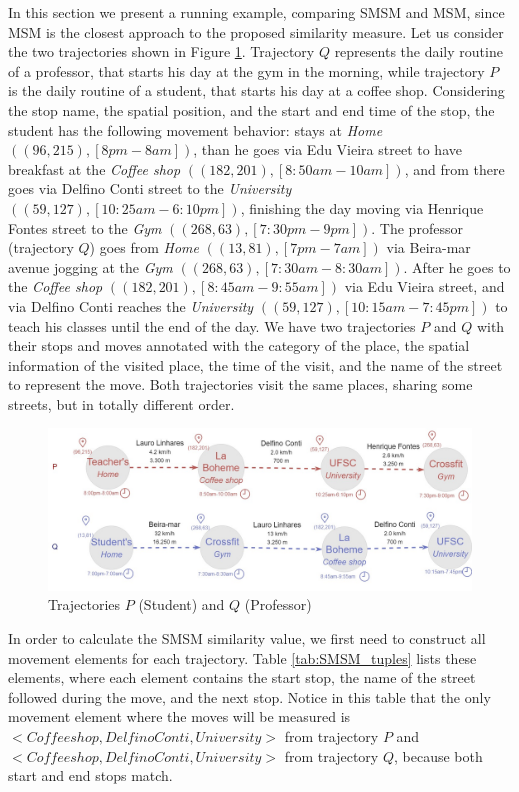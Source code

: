 \documentclass[12pt]{article}
\begin{document}
In this section we present a running example, comparing SMSM and MSM, since MSM is the closest approach to the proposed similarity measure.
Let us consider the two trajectories shown in Figure \ref{fig:SMSM_examples_PQ}. Trajectory $Q$ represents the daily routine of a professor, that starts his day at the gym in the morning, while trajectory $P$ is the daily routine of a student, that starts his day at a coffee shop. Considering the stop name, the spatial position, and the start and end time of the stop, the student has the following movement behavior: stays at \textit{Home} $((96,215), [8pm-8am])$, than he goes via Edu Vieira street to have breakfast at the \textit{Coffee shop} $((182,201), [8:50am-10am])$, and from there goes via Delfino Conti street to the \textit{University} $((59,127), [10:25am-6:10pm])$, finishing the day moving via Henrique Fontes street to the \textit{Gym} $((268,63), [7:30pm-9pm])$. The professor (trajectory $Q$) goes from \textit{Home} $((13,81), [7pm-7am])$ via Beira-mar avenue jogging at the \textit{Gym} $((268,63), [7:30am-8:30am])$. After he goes to the \textit{Coffee shop} $((182,201), [8:45am-9:55am])$ via Edu Vieira street, and via Delfino Conti reaches the \textit{University} $((59,127), [10:15am-7:45pm])$ to teach his classes until the end of the day. We have two trajectories $P$ and $Q$ with their stops and moves annotated with the category of the place, the spatial information of the visited place, the time of the visit, and the name of the street to represent the move. Both trajectories visit the same places, sharing some streets, but in totally different order.
\begin{figure}[h!]
\centering
\includegraphics[width=1\textwidth]{Images/Semantic_trajectories.jpg}
\caption{\label{fig:SMSM_examples_PQ} Trajectories $P$ (Student) and $Q$ (Professor)}
\end{figure}


In order to calculate the SMSM similarity value, we first need to construct all movement elements for each trajectory. Table \ref{tab:SMSM_tuples} lists these elements, where each element contains the start stop, the name of the street followed during the move, and the next stop. Notice in this table that the only movement element where the moves will be measured is $<Coffee shop, Delfino Conti, University>$ from trajectory $P$ and $<Coffee shop, Delfino Conti, University>$ from trajectory $Q$, because both start and end stops match.
\end{document}
